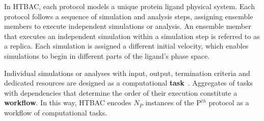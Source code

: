 In HTBAC, each protocol models a unique protein ligand physical system. Each
protocol follows a sequence of simulation and analysis steps, assigning
ensemble members to execute independent simulations or analysis. An ensemble
member that executes an independent simulation within a simulation step is
referred to as a replica. Each simulation is assigned a different initial
velocity, which enables simulations to begin in different parts of the
ligand's phase space.

Individual simulations or analyses with input, output, termination criteria
and dedicated resources are designed as a computational
\textbf{task}~\cite{power-of-many17}. Aggregates of tasks with dependencies
that determine the order of their execution constitute a \textbf{workflow}.
In this way, HTBAC encodes $N_P$ instances of the P$^{th}$ protocol as a
workflow of computational tasks.









